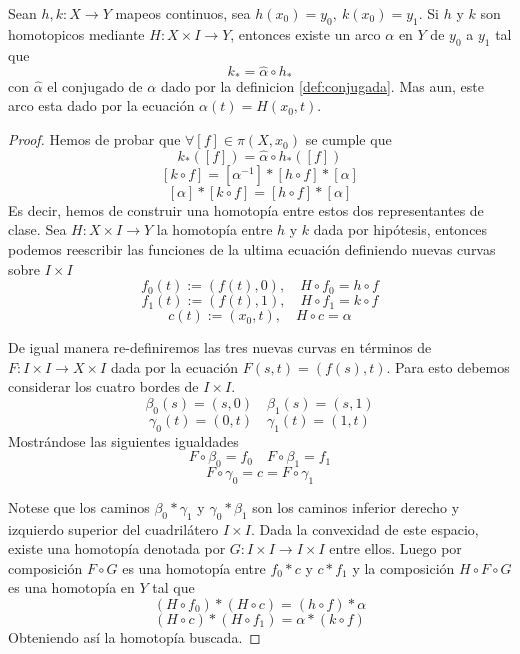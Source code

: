 \begin{lema} \label{lem:equiv-hom-lift}
  Sean \(h,k : X \to Y\) mapeos continuos, sea \(h (x_0) = y_0,\ k(x_0)
  = y_1\). Si \(h\) y \(k\) son homotopicos mediante \(H : X \times I
  \to Y\), entonces existe un arco \(\alpha\) en \(Y\) de \(y_0\) a
  \(y_1\) tal que
  \[k_* = \hat \alpha \circ h_* \]
  con \(\hat \alpha\) el conjugado de \(\alpha\) dado por la definicion
  \ref{def:conjugada}. Mas aun, este arco esta dado por la ecuación
  \(\alpha (t) = H (x_0, t)\).
\end{lema}
\begin{proof}
  Hemos de probar que \(\forall [f] \in \pi (X, x_0)\) se cumple que
  \[ k_* ([f]) = \hat \alpha \circ h_* ([f]) \]
  \[ [k \circ f] = [ \alpha^{-1} ] *  [h \circ f] * [\alpha] \]
  \[ [ \alpha ] * [k \circ f] =  [h \circ f] * [\alpha] \]
  Es decir, hemos de construir una homotopía entre estos dos
  representantes de clase. Sea \(H : X \times I \to Y\) la homotopía
  entre \(h\) y \(k\) dada por hipótesis, entonces podemos reescribir
  las funciones de la ultima ecuación definiendo nuevas curvas sobre \(I
  \times I\)
  \[ f_0(t) := \left( f(t), 0 \right), \quad H \circ f_0 = h \circ f \]
  \[ f_1(t) := \left( f(t), 1 \right), \quad H \circ f_1 = k \circ f \]
  \[ c(t) := (x_0, t), \quad H \circ c = \alpha \]

  De igual manera re-definiremos las tres nuevas curvas en términos de
  \(F : I \times I \to X \times I\) dada por la ecuación \(F(s,t) =
  (f(s),t)\). Para esto debemos considerar los cuatro bordes de
  \(I \times I\).
  \[ \beta_0(s) = (s, 0) \quad \beta_1(s) = (s, 1)\]
  \[ \gamma_0(t) = (0, t) \quad \gamma_1(t) = (1, t)\]
  Mostrándose las siguientes igualdades
  \[ F \circ \beta_0 = f_0 \quad F \circ \beta_1 = f_1\]
  \[ F \circ \gamma_0 = c = F \circ \gamma_1 \]

  Notese que los caminos \(\beta_0 * \gamma_1\) y \(\gamma_0 * \beta_1\)
  son los caminos inferior derecho y izquierdo superior del cuadrilátero
  \(I \times I\). Dada la convexidad de este espacio, existe una
  homotopía denotada por \(G : I \times I \to I \times I \) entre ellos.
  Luego por composición \(F \circ G\) es una homotopía entre \(f_0 * c\) y
  \(c * f_1\) y la composición \(H \circ F \circ G\) es una homotopía en
  \(Y\) tal que
  \[ (H \circ f_0) * (H \circ c) = (h \circ f) * \alpha \]
  \[ (H \circ c) * (H \circ f_1) = \alpha * (k \circ f) \]
  Obteniendo así la homotopía buscada.
\end{proof}

